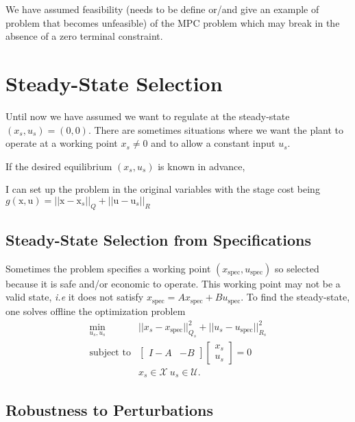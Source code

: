 \documentclass[11pt]{report}
\newcommand{\bs}[1]{\boldsymbol{#1}}
\newcommand{\bsu}{\bs{\mathrm{u}}}
\newcommand{\bsx}{\bs{\mathrm{x}}}
\begin{document}
We have assumed feasibility (needs to be define or/and give an example of problem that becomes unfeasible) of the MPC problem which may break in the absence of a zero terminal constraint.

\section{Steady-State Selection}
\label{sec:steady-state-selection}

Until now we have assumed we want to regulate at the steady-state $(x_s,u_s) = (0,0)$. There are sometimes situations where we want the plant to operate at a working point $x_s\neq 0$ and to allow a constant input $u_s$.

If the desired equilibrium $(x_s, u_s)$ is known in advance,


I can set up the problem in the original variables with the stage cost being $g(\bsx,\bsu) = ||\bsx-\bsx_s||_Q + ||\bsu-\bsu_s||_R$


\subsection{Steady-State Selection from Specifications}
\label{sec:steady-state-from-specs}

Sometimes the problem specifies a working point $(x_\text{spec},u_\text{spec})$ so selected because it is safe and/or economic to operate. This working point may not be a valid state, \textit{i.e} it does not satisfy $x_\text{spec} = Ax_\text{spec}+Bu_\text{spec}$. To find the steady-state, one solves offline the optimization problem
\begin{align*}
  \min_{u_s,u_s} & ||x_s-x_\text{spec}||_{Q_s}^2 + ||u_s-u_\text{spec}||_{R_s}^2 \\
  \text{subject to} &
                      \begin{bmatrix}
                        I-A & -B
                      \end{bmatrix}
                      \begin{bmatrix}
                        x_s \\ u_s
                      \end{bmatrix} = 0 \\
                 & x_s \in \mathcal{X}\ u_s \in \mathcal{U}.
\end{align*}


\subsection{Robustness to Perturbations}
\label{sec:robustness-to-perturbations}
\end{document}
